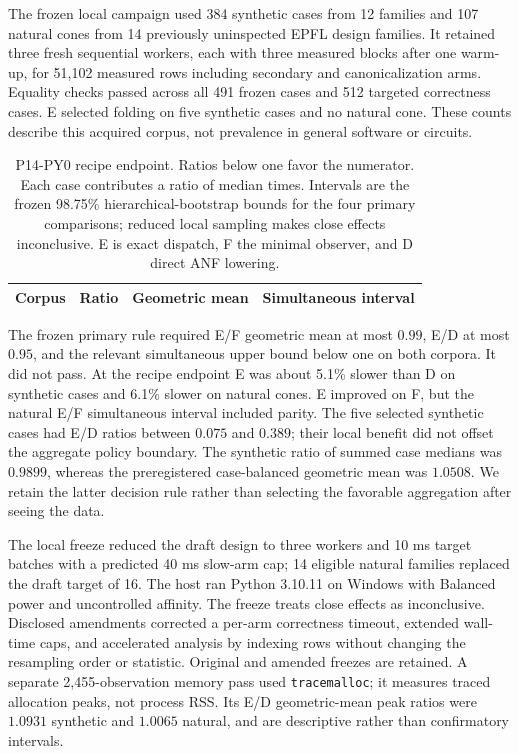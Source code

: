 The frozen local campaign used 384 synthetic cases from 12 families and 107
natural cones from 14 previously uninspected EPFL design families. It retained
three fresh sequential workers, each with three measured blocks after one
warm-up, for 51,102 measured rows including secondary and canonicalization
arms. Equality checks passed across all 491 frozen cases and 512 targeted
correctness cases. E selected folding on five synthetic cases and no natural
cone. These counts describe this acquired corpus, not prevalence in general
software or circuits.

\begin{table}[ht]\centering\small
\begin{tabular}{llrr}\toprule
Corpus & Ratio & Geometric mean & Simultaneous interval\\\midrule

\bottomrule\end{tabular}
\caption{P14-PY0 recipe endpoint. Ratios below one favor the numerator.
Each case contributes a ratio of median times. Intervals are the frozen
98.75\% hierarchical-bootstrap bounds for the four primary comparisons;
reduced local sampling makes close effects inconclusive. E is exact dispatch,
F the minimal observer, and D direct ANF lowering.}\label{tab:p14}
\end{table}

The frozen primary rule required E/F geometric mean at most $0.99$, E/D at
most $0.95$, and the relevant simultaneous upper bound below one on both
corpora. It did not pass. At the recipe endpoint E was about 5.1\% slower
than D on synthetic cases and 6.1\% slower on natural cones. E improved on F,
but the natural E/F simultaneous interval included parity. The five selected
synthetic cases had E/D ratios between $0.075$ and $0.389$; their local benefit
did not offset the aggregate policy boundary. The synthetic ratio of summed
case medians was $0.9899$, whereas the preregistered case-balanced geometric
mean was $1.0508$. We retain the latter decision rule rather than selecting
the favorable aggregation after seeing the data.

The local freeze reduced the draft design to three workers and 10 ms target
batches with a predicted 40 ms slow-arm cap; 14 eligible natural families
replaced the draft target of 16. The host ran Python 3.10.11 on Windows with
Balanced power and uncontrolled affinity. The freeze treats close effects as
inconclusive. Disclosed amendments corrected a per-arm correctness timeout,
extended wall-time caps, and accelerated analysis by indexing rows without
changing the resampling order or statistic. Original and amended freezes
are retained. A separate 2,455-observation memory pass used
\texttt{tracemalloc}; it measures traced allocation peaks, not process RSS.
Its E/D geometric-mean peak ratios were $1.0931$ synthetic and $1.0065$ natural,
and are descriptive rather than confirmatory intervals.


